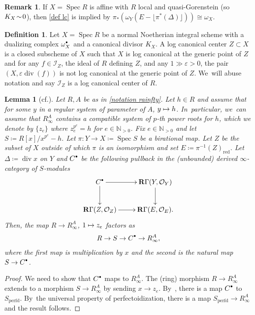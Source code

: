 \documentclass[11pt]{article}
\newcommand{\cf}{cf.\xspace}
\let\autoref\cref
\newcommand\mto{\mathchoice{\longmapsto}{\mapsto}{\mapsto}{\mapsto}}
\newcommand{\sbullet}{{\scriptscriptstyle\bullet}}
\newcommand{\csbullet}{{\raisebox{1pt}{$\sbullet$}}}
\theoremstyle{plain}
\newtheorem{lemma}[theorem]{Lemma}
\theoremstyle{definition}
\newtheorem{definition}[theorem]{Definition}
\newtheorem{remark}[theorem]{Remark}
\numberwithin{equation}{theorem}
\newcommand{\N}{\mathbb {N}}
\DeclareMathOperator{\Div}{{div}}
\newcommand{\perfd}{_{\mathrm{perfd}}}
\DeclareMathOperator{\red}{red}
\DeclareMathOperator{\Spec}{{Spec}}
\newcommand{\sI}{\mathcal{I}}
\newcommand{\sO}{\mathcal{O}}
\newcommand{\pe}{{p^e}}
\newcommand{\inv}{^{-1}}
\newcommand{\rafty}{R^A_\infty}
\newcommand{\rgamma}{\mathbf{R}\Gamma}
\begin{document}
\begin{remark}
If $X\!=\!\Spec R$ is affine with $R$ local and quasi-Gorenstein (so~$K_X\!\sim\! \nobreak0$), then \autoref{def lc} is implied by $\pi_*(\omega_Y(E- \lfloor \pi^*(\Delta) \rfloor))\cong \omega_X$.
\end{remark}

\begin{definition}
Let $X=\Spec R$ be a normal Noetherian integral scheme with a dualizing complex $\omega^\csbullet_X$ and a canonical divisor $K_X$. A log canonical center $Z\subset X$ is a closed subscheme of $X$ such that $X$ is log canonical at the generic point of $Z$ and for any $f\in \sI_Z$, the ideal of $R$ defining $Z$, and any $1\gg\varepsilon>0$, the pair $(X,\varepsilon \Div(f))$ is not log canonical at the generic point of $Z$. We~will abuse notation and say $\sI_Z$ is a log canonical center of $R$.
\end{definition}

\begin{lemma}[\cf{\cite[Lem.\,5.3]{BMPSTWWPerfectoidPure}}]\label{map to c bullet is pure}
Let $R, A$ be as in \autoref{notation rainfty}. Let $h\in R$ and assume that for some $y$ in a regular system of parameter of $A$, $y\mto h$. In~particular, we~can assume that $\rafty$ contains a compatible system of $p$-th power roots for $h$, which we denote by $\{z_e\}$ where $z_e^\pe=h$ for $e\in \N_{>0}$. Fix $e\in \N_{>0}$ and let $S\coloneqq R[x]/x^\pe-h$.
Let $\pi\colon Y\to X\coloneqq\Spec S$ be a birational map. Let $Z$ be the subset of $X$ outside of which $\pi$ is an isomorphism and set $E\coloneqq \pi\inv(Z)_{\red}$. Let $\Delta\coloneqq \Div x$ on $Y$ and $C^\csbullet$ be the following pullback in the (unbounded) derived $\infty$-category of $S$-modules
\[
\xymatrix{
C^\csbullet \ar[d] \ar[r] & \rgamma(Y,\sO_Y) \ar[d] \\
\rgamma(Z, \sO_Z) \ar[r]& \rgamma(E, \sO_E).
}
\]
Then, the map $R\to \rafty$, $1\mto z_e$ factors as
\[
R\to S \to C^\csbullet \to \rafty,
\]
where the first map is multiplication by $x$ and the second is the natural map $S\to C^\csbullet$.
\end{lemma}

\begin{proof}
We need to show that $C^\csbullet$ maps to $\rafty$. The (ring) morphism $R\to \rafty$ extends to a morphism $S\to \rafty$ by sending $x\to z_e$. By~\cite[Lem.\,5.3]{BMPSTWWPerfectoidPure}, there is a map $C^\csbullet$ to $S\perfd$. By~the universal property of perfectoidization, there is a map $S\perfd\to \rafty$ and the result follows.
\end{proof}
\end{document}
